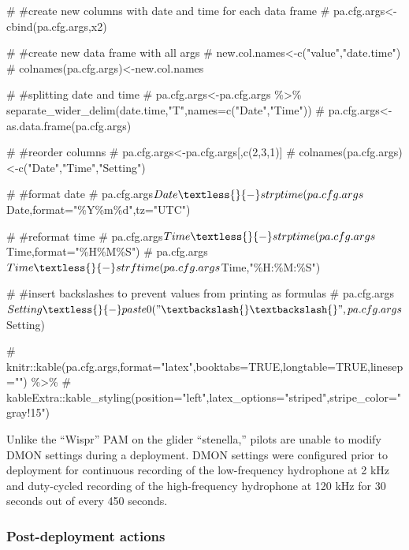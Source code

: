 \documentclass[
  letterpaper,
  DIV=11,
  numbers=noendperiod]{scrartcl}
\newenvironment{Shaded}{\begin{snugshade}}{\end{snugshade}}
\newcommand{\NormalTok}[1]{\textcolor[rgb]{0.00,0.23,0.31}{#1}}
\begin{document}
\begin{Shaded}
\begin{Highlighting}[]
\NormalTok{\# \#create new columns with date and time for each data frame}
\NormalTok{\# pa.cfg.args\textless{}{-}cbind(pa.cfg.args,x2)}

\NormalTok{\# \#create new data frame with all args}
\NormalTok{\# new.col.names\textless{}{-}c("value","date.time")}
\NormalTok{\# colnames(pa.cfg.args)\textless{}{-}new.col.names}

\NormalTok{\# \#splitting date and time}
\NormalTok{\# pa.cfg.args\textless{}{-}pa.cfg.args \%\textgreater{}\% separate\_wider\_delim(date.time,"T",names=c("Date","Time"))}
\NormalTok{\# pa.cfg.args\textless{}{-}as.data.frame(pa.cfg.args)}

\NormalTok{\# \#reorder columns}
\NormalTok{\# pa.cfg.args\textless{}{-}pa.cfg.args[,c(2,3,1)]}
\NormalTok{\# colnames(pa.cfg.args)\textless{}{-}c("Date","Time","Setting")}

\NormalTok{\# \#format date}
\NormalTok{\# pa.cfg.args$Date\textless{}{-}strptime(pa.cfg.args$Date,format="\%Y\%m\%d",tz="UTC")}

\NormalTok{\# \#reformat time}
\NormalTok{\# pa.cfg.args$Time\textless{}{-}strptime(pa.cfg.args$Time,format="\%H\%M\%S")}
\NormalTok{\# pa.cfg.args$Time\textless{}{-}strftime(pa.cfg.args$Time,"\%H:\%M:\%S")}

\NormalTok{\# \#insert backslashes to prevent values from printing as formulas}
\NormalTok{\# pa.cfg.args$Setting\textless{}{-}paste0("\textbackslash{}\textbackslash{}",pa.cfg.args$Setting)}

\NormalTok{\# knitr::kable(pa.cfg.args,format="latex",booktabs=TRUE,longtable=TRUE,linesep="") \%\textgreater{}\%}
\NormalTok{\#   kableExtra::kable\_styling(position="left",latex\_options="striped",stripe\_color="gray!15")}
\end{Highlighting}
\end{Shaded}

Unlike the ``Wispr'' PAM on the glider ``stenella,'' pilots are unable
to modify DMON settings during a deployment. DMON settings were
configured prior to deployment for continuous recording of the
low-frequency hydrophone at 2 kHz and duty-cycled recording of the
high-frequency hydrophone at 120 kHz for 30 seconds out of every 450
seconds.

\subsubsection{Post-deployment actions}\label{post-deployment-actions}
\end{document}
